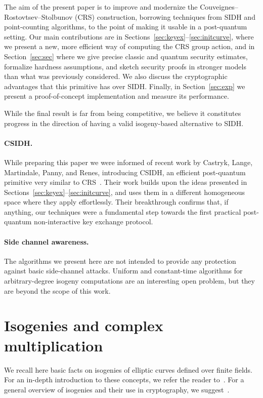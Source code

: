 \documentclass{llncs}
\begin{document}
The aim of the present paper is to improve and modernize the
Couveignes--Rostovtsev--Stolbunov (CRS) construction, borrowing
techniques from SIDH and point-counting algorithms, to the point of
making it usable in a post-quantum setting.  Our main contributions
are in Sections~\ref{sec:keyex}--\ref{sec:initcurve}, where we present
a new, more efficient way of computing the CRS group action, and in
Section~\ref{sec:sec} where we give precise classic and quantum
security estimates, formalize hardness assumptions, and sketch
security proofs in stronger models than what was previously
considered. We also discuss the cryptographic advantages
that this primitive has over SIDH.
Finally, in Section~\ref{sec:exp} we present a
proof-of-concept implementation and measure its performance.



While the final result is far from being competitive, we believe it
constitutes progress in the direction of having a valid isogeny-based
alternative to SIDH.

\paragraph{CSIDH.}
While preparing this paper we were informed of
recent work by Castryk, Lange, Martindale, Panny, and Renes,
introducing CSIDH, 
an efficient post-quantum primitive very similar to CRS~\cite{csidh}.
Their work builds upon the ideas presented in
Sections~\ref{sec:keyex}--\ref{sec:initcurve}, and uses them in a
different homogeneous space where they apply effortlessly.  Their
breakthrough confirms that, if anything, our techniques were a
fundamental step towards the first practical post-quantum
non-interactive key exchange protocol.

\paragraph{Side channel awareness.}
The algorithms we present here are not intended to provide any protection
against basic side-channel attacks.  
Uniform and constant-time algorithms for arbitrary-degree isogeny computations
are an interesting open problem,
but they are beyond the scope of this work.

\section{Isogenies and complex multiplication}
\label{sec:math}

We recall here basic facts on isogenies of elliptic curves defined
over finite fields. For an in-depth introduction to these concepts, we
refer the reader to~\cite{silverman:elliptic}. For a general
overview of isogenies and their use in cryptography, we
suggest~\cite{defeo2017isogenybased}.
\end{document}

